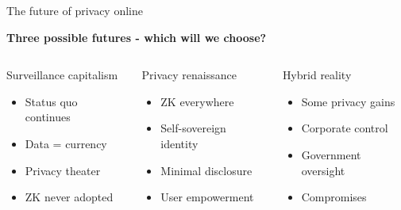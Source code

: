 \documentclass[aspectratio=169, lualatex, handout]{beamer}
\begin{document}
\begin{frame}{The future of privacy online}
	\begin{center}
		\textbf{Three possible futures - which will we choose?}
	\end{center}
	\vspace{0.5em}
	\begin{columns}[c]
		\begin{column}{0.33\textwidth}
			\begin{block}{Surveillance capitalism}
				\begin{itemize}
					\item Status quo continues
					\item Data = currency
					\item Privacy theater
					\item ZK never adopted
				\end{itemize}
			\end{block}
		\end{column}
		\begin{column}{0.33\textwidth}
			\begin{block}{Privacy renaissance}
				\begin{itemize}
					\item ZK everywhere
					\item Self-sovereign identity
					\item Minimal disclosure
					\item User empowerment
				\end{itemize}
			\end{block}
		\end{column}
		\begin{column}{0.33\textwidth}
			\begin{block}{Hybrid reality}
				\begin{itemize}
					\item Some privacy gains
					\item Corporate control
					\item Government oversight
					\item Compromises
				\end{itemize}
			\end{block}
		\end{column}
	\end{columns}
\end{frame}
\end{document}
